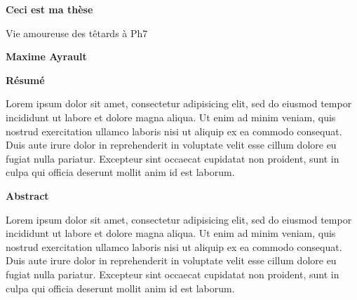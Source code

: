 \thispagestyle{plain}
\begin{center}
    \Large
    \textbf{Ceci est ma th\`ese}
    
    \vspace{0.4cm}
    \large
    Vie amoureuse des t\^etards \`a Ph7
    
    \vspace{0.4cm}
    \textbf{Maxime Ayrault}
    
    \vspace{0.9cm}
    \textbf{R\'esum\'e}
\end{center}
Lorem ipsum dolor sit amet, consectetur adipisicing elit, sed do eiusmod tempor incididunt ut labore et dolore magna aliqua. Ut enim ad minim veniam, quis nostrud exercitation ullamco laboris nisi ut aliquip ex ea commodo consequat. Duis aute irure dolor in reprehenderit in voluptate velit esse cillum dolore eu fugiat nulla pariatur. Excepteur sint occaecat cupidatat non proident, sunt in culpa qui officia deserunt mollit anim id est laborum.

\begin{center}
    \vspace{0.9cm}
    \textbf{Abstract}
\end{center}
Lorem ipsum dolor sit amet, consectetur adipisicing elit, sed do eiusmod tempor incididunt ut labore et dolore magna aliqua. Ut enim ad minim veniam, quis nostrud exercitation ullamco laboris nisi ut aliquip ex ea commodo consequat. Duis aute irure dolor in reprehenderit in voluptate velit esse cillum dolore eu fugiat nulla pariatur. Excepteur sint occaecat cupidatat non proident, sunt in culpa qui officia deserunt mollit anim id est laborum.

